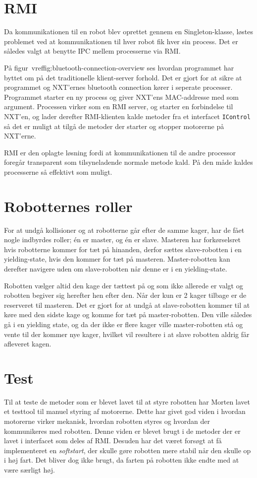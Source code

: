 \section{RMI}
Da kommunikationen til en robot blev oprettet gennem en Singleton-klasse, løstes problemet ved at kommunikationen til hver robot fik hver sin process. Det er således valgt at benytte IPC mellem processerne via RMI.


På figur~vref{fig:bluetooth-connection-overview} ses hvordan programmet har byttet om på det traditionelle klient-server forhold. Det er gjort for at sikre at programmet og NXT'ernes bluetooth connection kører i seperate processer. Programmet starter en ny process og giver NXT'ens MAC-addresse med som argument. Processen virker som en RMI server, og starter en forbindelse til NXT'en, og lader derefter RMI-klienten kalde metoder fra et interfacet \texttt{IControl} så det er muligt at tilgå de metoder der starter og stopper motorerne på NXT'erne.

RMI er den oplagte løsning fordi at kommunikationen til de andre processor foregår transparent som tilsyneladende normale metode kald. På den måde kaldes processerne så effektivt som muligt.

\section{Robotternes roller}
For at undgå kollisioner og at robotterne går efter de samme kager, har de fået nogle indbyrdes roller; én er master, og én er slave. Masteren har forkørselsret hvis robotterne kommer for tæt på hinanden, derfor sættes slave-robotten i en yielding-state, hvis den kommer for tæt på masteren. Master-robotten kan derefter navigere uden om slave-robotten når denne er i en yielding-state.

Robotten vælger altid den kage der tættest på og som ikke allerede er valgt og robotten begiver sig herefter hen efter den. Når der kun er 2 kager tilbage er de reserveret til masteren. Det er gjort for at undgå at slave-robotten kommer til at køre med den sidste kage og komme for tæt på master-robotten. Den ville således gå i en yielding state, og da der ikke er flere kager ville master-robotten stå og vente til der kommer nye kager, hvilket vil resultere i at slave robotten aldrig får afleveret kagen.

\section{Test}
Til at teste de metoder som er blevet lavet til at styre robotten har Morten lavet et testtool til manuel styring af motorerne. Dette har givet god viden i hvordan motorerne virker mekanisk, hvordan robotten styres og hvordan der kommunikeres med robotten. Denne viden er blevet brugt i de metoder der er lavet i interfacet som deles af RMI. Desuden har det været forsøgt at få implementeret en \textit{softstart}, der skulle gøre robotten mere stabil når den skulle op i høj fart. Det bliver dog ikke brugt, da farten på robotten ikke endte med at være særligt høj.

